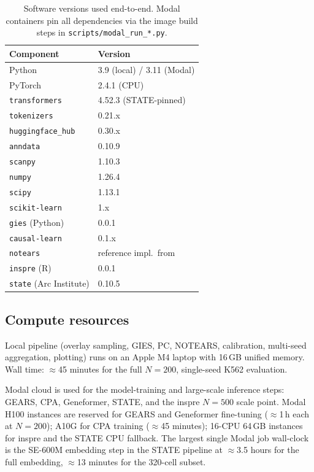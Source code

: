 \documentclass{article}
\theoremstyle{plain}
\theoremstyle{definition}
\theoremstyle{remark}
\begin{document}
\begin{table}[h]
\centering
\small
\begin{tabular}{ll}
\toprule
\textbf{Component} & \textbf{Version} \\
\midrule
Python                                & 3.9 (local) / 3.11 (Modal) \\
PyTorch                               & 2.4.1 (CPU) \\
\texttt{transformers}                 & 4.52.3 (STATE-pinned) \\
\texttt{tokenizers}                   & 0.21.x \\
\texttt{huggingface\_hub}             & 0.30.x \\
\texttt{anndata}                      & 0.10.9 \\
\texttt{scanpy}                       & 1.10.3 \\
\texttt{numpy}                        & 1.26.4 \\
\texttt{scipy}                        & 1.13.1 \\
\texttt{scikit-learn}                 & 1.x \\
\texttt{gies} (Python)                & 0.0.1 \\
\texttt{causal-learn}                 & 0.1.x \\
\texttt{notears}                      & reference impl.\ from~\citep{zheng2018notears} \\
\texttt{inspre} (R)                   & 0.0.1 \\
\texttt{state} (Arc Institute)        & 0.10.5 \\
\bottomrule
\end{tabular}
\caption{Software versions used end-to-end. Modal containers pin all dependencies via the image build steps in \texttt{scripts/modal\_run\_*.py}.}
\label{tab:software}
\end{table}

\subsection{Compute resources}
\label{app:compute}

Local pipeline (overlay sampling, GIES, PC, NOTEARS, calibration, multi-seed aggregation, plotting) runs on an Apple M4 laptop with 16\,GB unified memory. Wall time: $\approx$45 minutes for the full $N{=}200$, single-seed K562 evaluation.

Modal cloud is used for the model-training and large-scale inference steps: GEARS, CPA, Geneformer, STATE, and the inspre $N{=}500$ scale point. Modal H100 instances are reserved for GEARS and Geneformer fine-tuning ($\approx$1\,h each at $N{=}200$); A10G for CPA training ($\approx$45 minutes); 16-CPU 64\,GB instances for inspre and the STATE CPU fallback. The largest single Modal job wall-clock is the SE-600M embedding step in the STATE pipeline at $\approx$3.5 hours for the full embedding, $\approx$13 minutes for the 320-cell subset.
\end{document}
